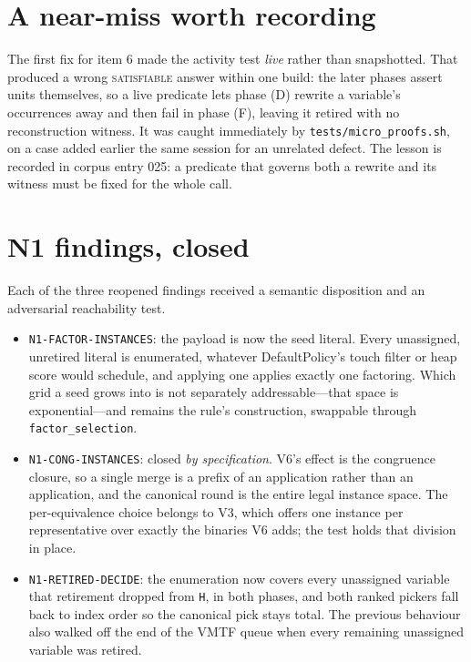 \documentclass[11pt]{article}
\newcommand{\code}[1]{\texttt{#1}}
\begin{document}
\section*{A near-miss worth recording}
The first fix for item 6 made the activity test \emph{live} rather than
snapshotted.  That produced a wrong \textsc{satisfiable} answer within one
build: the later phases assert units themselves, so a live predicate lets phase
(D) rewrite a variable's occurrences away and then fail in phase (F), leaving it
retired with no reconstruction witness.  It was caught immediately by
\code{tests/micro\_proofs.sh}, on a case added earlier the same session for an
unrelated defect.  The lesson is recorded in corpus entry 025: a predicate that
governs both a rewrite and its witness must be fixed for the whole call.

\section*{N1 findings, closed}
Each of the three reopened findings received a semantic disposition and an
adversarial reachability test.

\begin{itemize}
\item \code{N1-FACTOR-INSTANCES}: the payload is now the seed literal.  Every
unassigned, unretired literal is enumerated, whatever DefaultPolicy's touch
filter or heap score would schedule, and applying one applies exactly one
factoring.  Which grid a seed grows into is not separately addressable---that
space is exponential---and remains the rule's construction, swappable through
\code{factor\_selection}.
\item \code{N1-CONG-INSTANCES}: closed \emph{by specification}.  V6's effect is
the congruence closure, so a single merge is a prefix of an application rather
than an application, and the canonical round is the entire legal instance
space.  The per-equivalence choice belongs to V3, which offers one instance per
representative over exactly the binaries V6 adds; the test holds that division
in place.
\item \code{N1-RETIRED-DECIDE}: the enumeration now covers every unassigned
variable that retirement dropped from \code{H}, in both phases, and both ranked
pickers fall back to index order so the canonical pick stays total.  The
previous behaviour also walked off the end of the VMTF queue when every
remaining unassigned variable was retired.
\end{itemize}
\end{document}
